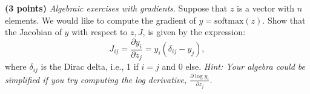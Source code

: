 \noindent {} 
\textbf{(3 points)} \textit{Algebraic exercises with gradients}. Suppose that $z$ is a vector with $n$ elements. We would like to compute the gradient of $y = \textrm{softmax}(z)$. Show that the Jacobian of $y$ with respect to $z, J$, is given by the expression:
\[
    J_{ij} = \frac{\partial y_i}{\partial z_j} = y_i (\delta_{ij} - y_j),
\]
where $\delta_{ij}$ is the Dirac delta, i.e., 1 if $i = j$ and 0 else. \textit{Hint: Your algebra could be simplified if you try computing the log derivative, $\frac{\partial \log y_i}{\partial z_j}$.} \\
\noindent {}
